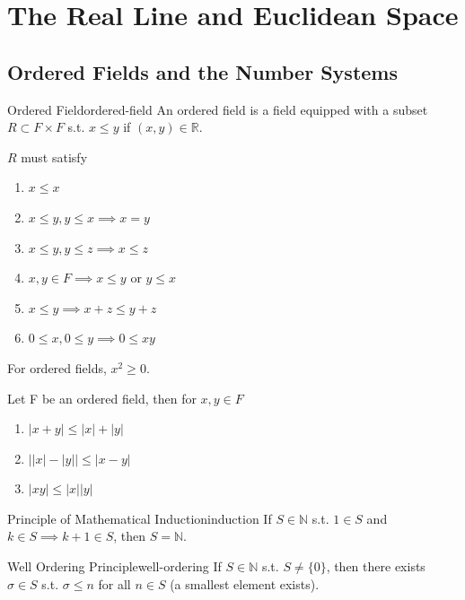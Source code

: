 \documentclass[10pt]{report}
\begin{document}
\tableofcontents

\chapter{The Real Line and Euclidean Space}

\section{Ordered Fields and the Number Systems}

\begin{defn}{Ordered Field}{ordered-field}
	An ordered field is a field equipped with a subset $R \subset F \times F$ s.t. $x \leq y$ if $(x,y)  \in \mathbb{R}$.
\end{defn}

$R$ must satisfy
\begin{enumerate}
	\item $x \leq x$
	\item $x \leq y, y \leq x \implies x = y$ 
	\item $x \leq y, y \leq z \implies x \leq z$
	\item $x, y \in F \implies x \leq y$ or $y \leq x$
	\item $x \leq y \implies x + z \leq y + z$
	\item  $0 \leq x, 0 \leq y \implies 0 \leq xy$
\end{enumerate}

For ordered fields, $x^2 \geq 0$.

\begin{prop}
	Let F be an ordered field, then for $x,y \in F$ 
\end{prop}
\begin{enumerate}
	\item $|x+y| \leq |x| + |y|$
	\item $\big| |x| - |y| \big| \leq |x-y|$
	\item $|xy| \leq |x||y|$
\end{enumerate}

\begin{defn}{Principle of Mathematical Induction}{induction}
	If $S \in \mathbb{N}$ s.t. $1 \in S$ and $k \in S \implies k+1 \in S$, then $S = \mathbb{N}$.
\end{defn}

\begin{defn}{Well Ordering Principle}{well-ordering}
	If $S \in \mathbb{N}$ s.t. $S \neq \{0\}$, then there exists $\sigma \in S$ s.t. $\sigma \leq n$ for all $n \in S$ (a smallest element exists).
\end{defn}
\end{document}
